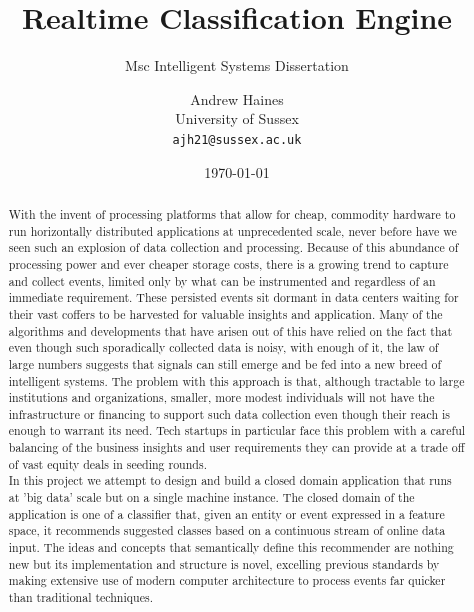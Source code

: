 \documentclass[a4paper,11pt]{scrreprt}
\begin{document}
\title{Realtime Classification Engine}
\subtitle{Msc Intelligent Systems Dissertation}
\author{Andrew Haines\\
	University of Sussex\\
	\texttt{ajh21@sussex.ac.uk}}

\date{\today}
\maketitle

\begin{abstract}
With the invent of processing platforms that allow for cheap, commodity hardware to run horizontally distributed applications at unprecedented scale, never before have we seen such an explosion of data collection and processing. Because of this abundance of processing power and ever cheaper storage costs, there is a growing trend to capture and collect events, limited only by what can be instrumented and regardless of an immediate requirement. These persisted events sit dormant in data centers waiting for their vast coffers to be harvested for valuable insights and application. Many of the algorithms and developments that have arisen out of this have relied on the fact that even though such sporadically collected data is noisy, with enough of it, the law of large numbers suggests that signals can still emerge and be fed into a new breed of intelligent systems\cite{bigdata}. The problem with this approach is that, although tractable to large institutions and organizations, smaller, more modest individuals will not have the infrastructure or financing to support such data collection even though their reach is enough to warrant its need. Tech startups in particular face this problem with a careful balancing of the business insights and user requirements they can provide at a trade off of vast equity deals in seeding rounds.\\

In this project we attempt to design and build a closed domain application that runs at 'big data' scale but on a single machine instance. The closed domain of the application is one of a classifier that, given an entity or event expressed in a feature space, it recommends suggested classes based on a continuous stream of online data input. The ideas and concepts that semantically define this recommender are nothing new but its implementation and structure is novel, excelling previous standards by making extensive use of modern computer architecture to process events far quicker than traditional techniques.

\end{abstract}
\end{document}
